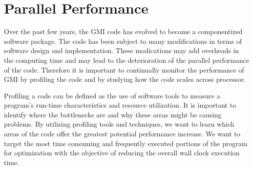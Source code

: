 %
\chapter[Parallel Performance]{Parallel Performance}
\label{chap:performance}

Over the past few years, the GMI code has evolved to become a
componentized software package.
The code has been subject to many modifications in terms of
software design and implementation.
These modications may add overheads in the computing time and
may lead to the deterioration of the parallel performance of the code.
Therefore it is important to continually monitor the performance
of GMI by profiling the code and by studying how the code scales
across processor.

Profiling a code can be defined as the use of software tools to measure
a program's run-time characteristics and resource utilization.
It is important to identify where the bottlenecks are
and why these areas might be causing problems.
By utilizing profiling tools and techniques, we want to learn which
areas of the code offer the greatest potential performance increase.
We want to target the most time consuming and frequently executed portions
of the program for optimization with the objective of reducing the
overall wall clock execution time.

